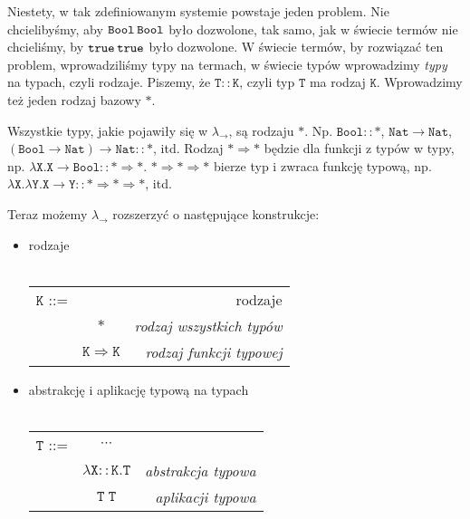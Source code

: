 \documentclass[11pt,leqno]{article}
\begin{document}
Niestety, w tak zdefiniowanym systemie powstaje jeden problem. Nie chcielibyśmy, aby $\mathtt{Bool \hspace{0.2em} Bool}$ było dozwolone, tak samo, jak w świecie termów nie chcieliśmy, by $\mathtt{true \hspace{0.2em} true}$ było dozwolone. W świecie termów, by rozwiązać ten problem, wprowadziliśmy typy na termach, w świecie typów wprowadzimy \textit{typy} na typach, czyli rodzaje. Piszemy, że $\mathtt{T::K}$, czyli typ $\mathtt{T}$ ma rodzaj $\mathtt{K}$. Wprowadzimy też jeden rodzaj bazowy $\mathtt{\ast}$.

Wszystkie typy, jakie pojawiły się w $\lambda_{\rightarrow}$, są rodzaju $\mathtt{\ast}$. Np. $\mathtt{Bool :: \ast}$, $\mathtt{Nat \rightarrow Nat}$, $\mathtt{(Bool \rightarrow Nat) \rightarrow Nat} :: \ast$, itd. Rodzaj $\mathtt{\ast \Rightarrow \ast}$ będzie dla funkcji z typów w typy, np. $\mathtt{\lambda X.X \rightarrow Bool::\ast \Rightarrow \ast }$. $\mathtt{\ast \Rightarrow \ast \Rightarrow \ast}$ bierze typ i zwraca funkcję typową, np. $\mathtt{\lambda X. \lambda Y. X \rightarrow Y::\ast \Rightarrow \ast \Rightarrow \ast}$, itd. 

Teraz możemy $\lambda_{\rightarrow}$ rozszerzyć o następujące konstrukcje: 
\begin{itemize}
    \item rodzaje \\ \\
\begin{tabular}{| l c r |}
  \hline
  $\mathtt{K}$ ::= &  & rodzaje  \\
   & $\mathtt{\ast}$ & \textit{rodzaj wszystkich typów} \\
   & $\mathtt{K \Rightarrow K}$ & \textit{rodzaj funkcji typowej} \\
  \hline
\end{tabular}
    \item abstrakcję i aplikację typową na typach \\ \\
\begin{tabular}{| l c r |}
   \hline
   $\mathtt{T}$ ::= & $\cdots$ &  \\
   & $\mathtt{\lambda X::K.T}$ & \textit{abstrakcja typowa} \\
   & $\mathtt{T\;T}$ & \textit{aplikacji typowa} \\
   \hline
\end{tabular}
\end{itemize} 
\end{document}
